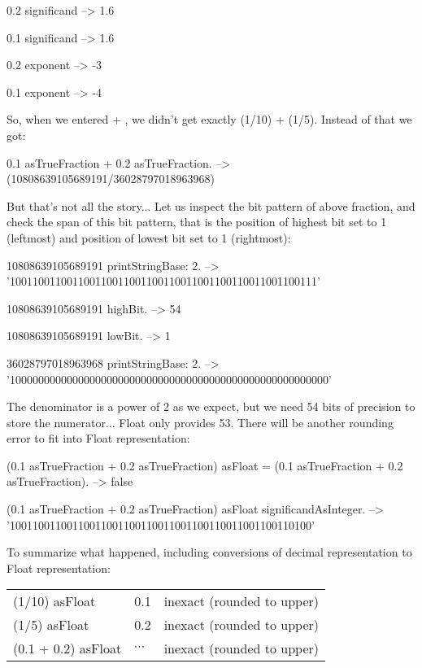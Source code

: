 \documentclass[a4paper,10pt,twoside]{book}
\begin{document}
\begin{code}{} 
0.2 significand
 	--> 1.6
	
0.1 significand 
	--> 1.6	
	
0.2 exponent
	--> -3
	
0.1 exponent
	--> -4
\end{code}


So, when we entered  + , we didn't get exactly (1/10) + (1/5).
Instead of that we got:

 \begin{code}{}
0.1 asTrueFraction + 0.2 asTrueFraction.
	-->  (10808639105689191/36028797018963968)
\end{code}

But that's not all the story... Let us inspect the bit pattern of above fraction, and check the span of this bit pattern, that is the position of highest bit set to 1 (leftmost) and position of lowest bit set to 1 (rightmost):
 \begin{code}{}
10808639105689191 printStringBase: 2.
	-->  '100110011001100110011001100110011001100110011001100111'
	
10808639105689191 highBit.
	-->  54
	
10808639105689191 lowBit.
	-->  1

36028797018963968 printStringBase: 2.
	-->  '10000000000000000000000000000000000000000000000000000000'
\end{code}

The denominator is a power of 2 as we expect, but we need 54 bits of precision to store the numerator... Float only provides 53. There will be another rounding error to fit into Float representation:

\begin{code}{}
(0.1 asTrueFraction + 0.2 asTrueFraction) asFloat = (0.1 asTrueFraction + 0.2 asTrueFraction).
	--> false
	
(0.1 asTrueFraction + 0.2 asTrueFraction) asFloat significandAsInteger.
	--> '10011001100110011001100110011001100110011001100110100'
\end{code}

To summarize what happened, including conversions of decimal representation to Float representation:\\
\begin{tabular}{lll}
(1/10) asFloat & 0.1 & inexact (rounded to upper) \\
(1/5) asFloat & 0.2 & inexact (rounded to upper) \\
(0.1 + 0.2) asFloat & $\cdots$ & inexact (rounded to upper)  \\
\end{tabular}
\end{document}
